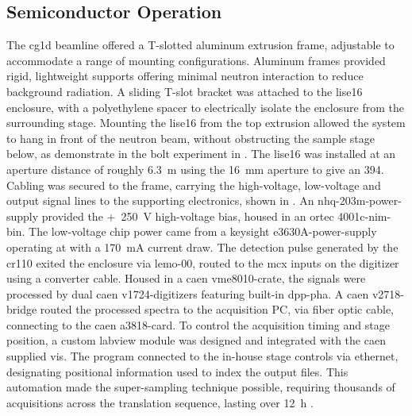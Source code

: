 \documentclass[../../../main.tex]{subfiles}%
\begin{document}
%
    \subsection{Semiconductor Operation}%
    \label{sec:chapter-3:beamline-testing:semiconductor-operation}%
    The \gls{cg1d} \gls{beamline} offered a T-slotted aluminum extrusion frame, adjustable to accommodate a range of mounting configurations.
    Aluminum frames provided rigid, lightweight supports offering minimal neutron interaction to reduce background radiation.
    A sliding T-slot bracket was attached to the \gls{lise16} enclosure, with a polyethylene spacer to electrically isolate the enclosure from the surrounding stage.
    Mounting the \gls{lise16} from the top extrusion allowed the system to hang in front of the neutron beam, without obstructing the sample stage below, as demonstrate in the bolt experiment in .
    The \gls{lise16} was installed at an aperture distance of roughly  \SI{6.3}{\meter} using the \SI{16}{\milli\meter} aperture to give an  \num{394}. 
    Cabling was secured to the frame, carrying the \gls{high-voltage}, \gls{low-voltage} and output signal lines to the supporting electronics, shown in .
    An \gls{nhq-203m-power-supply} provided the \SI{250}[+]{\volt} \gls{high-voltage} bias, housed in an \gls{ortec} \gls{4001c-nim-bin}.
    The \gls{low-voltage} chip power came from a \gls{keysight} \gls{e3630A-power-supply} operating at  with a \SI{170}{\milli\ampere} current draw.
    The detection pulse generated by the \gls{cr110} exited the enclosure via \gls{lemo-00}, routed to the \gls{mcx} inputs on the digitizer using a converter cable.
    Housed in a \gls{caen} \gls{vme8010-crate}, the signals were processed by dual \gls{caen} \glspl{v1724-digitizer} featuring built-in \gls{dpp-pha}.
    A \gls{caen} \gls{v2718-bridge} routed the processed spectra to the acquisition PC, via fiber optic cable, connecting to the \gls{caen} \gls{a3818-card}. 
    To control the acquisition timing and stage position, a custom \gls{labview} module was designed and integrated with the \gls{caen} supplied \glspl{vi}.
    The program connected to the in-house stage controls via ethernet, designating positional information used to index the output files.
    This automation made the \gls{super-sampling} technique possible, requiring thousands of acquisitions across the translation sequence, lasting over \SI{12}{\hour} \cite{Herrera_2016}.
\end{document}
